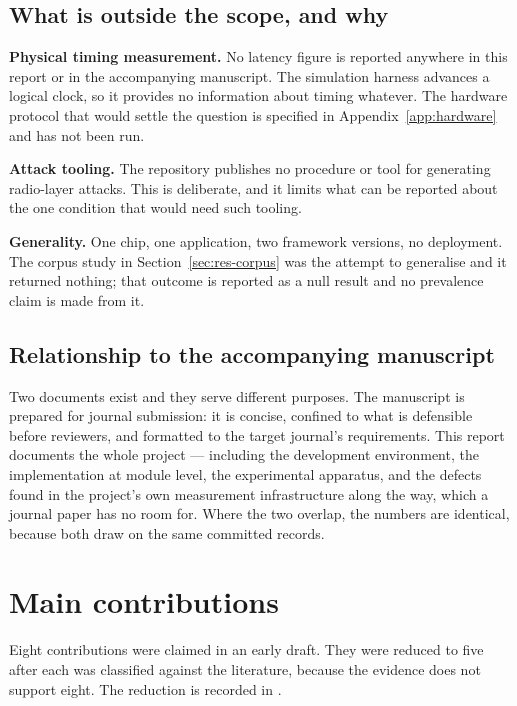 \subsection*{What is outside the scope, and why}

\textbf{Physical timing measurement.} No latency figure is reported anywhere in this report or
in the accompanying manuscript. The simulation harness advances a logical clock, so it provides
no information about timing whatever. The hardware protocol that would settle the question is
specified in Appendix~\ref{app:hardware} and has not been run.

\textbf{Attack tooling.} The repository publishes no procedure or tool for generating
radio-layer attacks. This is deliberate, and it limits what can be reported about the one
condition that would need such tooling.

\textbf{Generality.} One chip, one application, two framework versions, no deployment. The
corpus study in Section~\ref{sec:res-corpus} was the attempt to generalise and it returned
nothing; that outcome is reported as a null result and no prevalence claim is made from it.

\subsection*{Relationship to the accompanying manuscript}

Two documents exist and they serve different purposes. The manuscript is prepared for journal
submission: it is concise, confined to what is defensible before reviewers, and formatted to
the target journal's requirements. This report documents the whole project — including the
development environment, the implementation at module level, the experimental apparatus, and
the defects found in the project's own measurement infrastructure along the way, which a
journal paper has no room for. Where the two overlap, the numbers are identical, because both
draw on the same committed records.

\section{Main contributions}

Eight contributions were claimed in an early draft. They were reduced to five after each was
classified against the literature, because the evidence does not support eight. The reduction
is recorded in .

